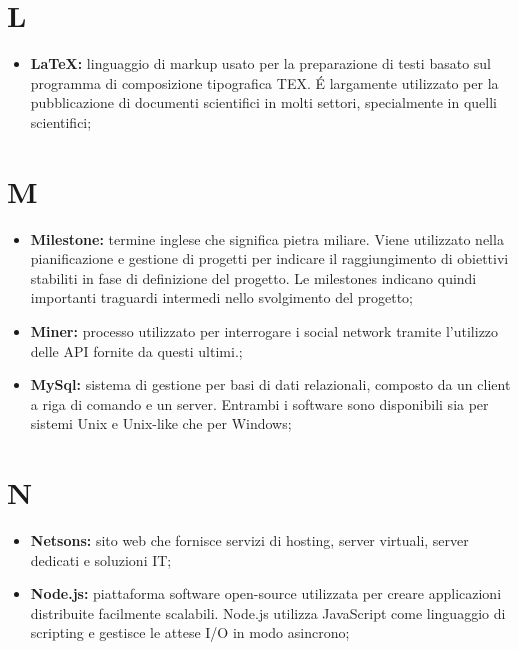 %


\section*{L} %
\label{sec:l}
	\begin{itemize}
		\item \textbf{\LaTeX:} linguaggio di markup usato per la preparazione di testi basato sul programma di composizione tipografica TEX. É largamente utilizzato per la pubblicazione di documenti scientifici in molti settori, specialmente in quelli scientifici;
	\end{itemize}
\pagebreak

\section*{M} %
\label{sec:m}
	\begin{itemize}
		\item \textbf{Milestone:} termine inglese che significa pietra miliare. Viene utilizzato nella pianificazione e gestione di progetti per indicare il raggiungimento di obiettivi stabiliti in fase di definizione del progetto. Le milestones indicano quindi importanti traguardi intermedi nello svolgimento del progetto;
		\item \textbf{Miner:} processo utilizzato per interrogare i social network tramite l'utilizzo delle API fornite da questi ultimi.;	
		\item \textbf{MySql:} sistema di gestione per basi di dati relazionali, composto da un client a riga di comando e un server. Entrambi i software sono disponibili sia per sistemi Unix e Unix-like che per Windows;
	\end{itemize}
\pagebreak

\section*{N} %
\label{sec:n}
	\begin{itemize}
		\item \textbf{Netsons:} sito web che fornisce servizi di hosting, server virtuali, server dedicati e soluzioni IT;
		\item \textbf{Node.js:} piattaforma software open-source utilizzata per creare applicazioni distribuite facilmente scalabili. Node.js utilizza JavaScript come linguaggio di scripting e gestisce le attese I/O in modo asincrono;
	\end{itemize}
\pagebreak
